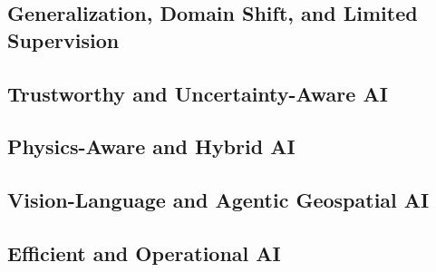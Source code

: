 \documentclass[
    11pt,
    a4paper,
    parskip=half,
    bibliography=totoc,
    numbers=noenddot
]{scrartcl}
\begin{document}

\subsection{Generalization, Domain Shift, and Limited Supervision}


\subsection{Trustworthy and Uncertainty-Aware AI}


\subsection{Physics-Aware and Hybrid AI}


\subsection{Vision-Language and Agentic Geospatial AI}


\subsection{Efficient and Operational AI}
\end{document}

